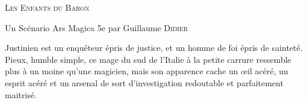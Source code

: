


\begin{center}
\vfill
    {\Large\scshape Les Enfants du Baron\par}
    \vspace{0.5cm}
{Un Scénario Ars Magica 5e par Guillaume \textsc{Didier}\par}
    \vfill
    {\LARGE\bfseries \magusname \par}



\vfill
    \begin{center}
        \parbox{.8\textwidth}{
            Justinien est un enquêteur épris de justice, et un homme de foi épris de sainteté.
            Pieux, humble simple, ce mage du sud de l'Italie à la petite carrure ressemble
            plus à un moine qu'une magicien, mais son apparence cache un œil acéré, un esprit acéré et
            un arsenal de sort d'investigation redoutable et parfaitement maitrisé.
            }
    \end{center}
\vfill
\end{center}
\pagebreak

\shortsheet{}



